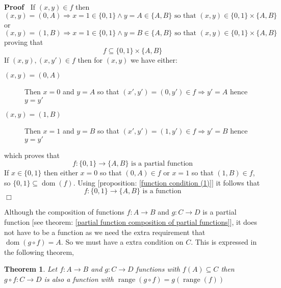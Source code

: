 \documentclass{book}
\newcommand{\tmop}[1]{\ensuremath{\operatorname{#1}}}
\newenvironment{proof}{\noindent\textbf{Proof\ }}{\hspace*{\fill}$\Box$\medskip}
\newtheorem{theorem}{Theorem}
\begin{document}
\begin{proof}
  If $(x, y) \in f$ then
  \[ (x, y) = (0, A) \Rightarrow x = 1 \in \{ 0, 1 \} \wedge y = A \in \{ A, B
     \} \text{ so that } (x, y) \in \{ 0, 1 \} \times \{ A, B \} \]
  or
  \[ (x, y) = (1, B) \Rightarrow x = 1 \in \{ 0, 1 \} \wedge y = B \in \{ A, B
     \} \text{ so that } (x, y) \in \{ 0, 1 \} \times \{ A, B \} \]
  proving that
  \[ f \subseteq \{ 0, 1 \} \times \{ A, B \} \]
  If $(x, y), (x, y') \in f$ then for $(x, y)$ we have either:
  \begin{description}
    \item[$(x, y) = (0, A)$] Then $x = 0$ and $y = A$ so that $(x', y') = (0,
    y') \in f \Rightarrow y' = A$ hence $y = y'$
    
    \item[$(x, y) = (1, B)$] Then $x = 1$ and $y = B$ so that $(x', y') = (1,
    y') \in f \Rightarrow y' = B$ hence $y = y'$
  \end{description}
  which proves that
  \[ f : \{ 0, 1 \} \rightarrow \{ A, B \} \text{ is a partial function} \]
  If $x \in \{ 0, 1 \}$ then either $x = 0$ so that $(0, A) \in f$ or $x = 1$
  so that $(1, B) \in f$, so $\{ 0, 1 \} \subseteq \tmop{dom} (f)$. Using
  [proposition: \ref{function condition (1)}] it follows that
  \[ f : \{ 0, 1 \} \rightarrow \{ A, B \} \text{ is a function} \]
\end{proof}

Although the composition of functions $f : A \rightarrow B$ and $g : C
\rightarrow D$ is a partial function [see theorem: \ref{partial function
composition of partial functions}], it does not have to be a function as we
need the extra requirement that $\tmop{dom} (g \circ f) = A$. So we must have
a extra condition on $C$. This is expressed in the following theorem,

\begin{theorem}
  \label{function composition of functions is a fucntion}Let $f : A
  \rightarrow B$ and $g : C \rightarrow D$ functions with $f (A) \subseteq C$
  then $g \circ f : C \rightarrow D$ is also a function with $\tmop{range} (g
  \circ f) = g (\tmop{range} (f))$
\end{theorem}
\end{document}
